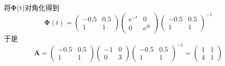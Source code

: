 \documentclass[UTF8,a4paper]{ctexart}
\begin{document}
\section{}
将$\mathbf{\Phi }$(t)对角化得到$$\mathbf{\Phi }(t)=\begin{pmatrix} -0.5& 0.5\\ 1& 1 \end{pmatrix} \begin{pmatrix}\mathrm{e}^{-t}& 0\\ 0& \mathrm{e}^{3t} \end{pmatrix} \begin{pmatrix} -0.5& 0.5\\ 1& 1 \end{pmatrix}^{-1}$$于是$$\mathbf{A}=
\begin{pmatrix} -0.5& 0.5\\ 1& 1 \end{pmatrix} \begin{pmatrix}-1& 0\\ 0& 3 \end{pmatrix} \begin{pmatrix} -0.5& 0.5\\ 1& 1 \end{pmatrix}^{-1}=\begin{pmatrix} 1& 1\\ 4& 1 \end{pmatrix}$$
\end{document}
